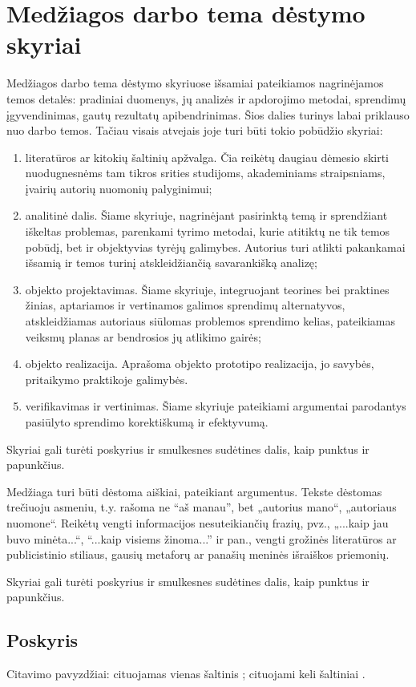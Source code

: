 \documentclass[
]{VUMIFSEMasterThesis}
\begin{document}
\section{Medžiagos darbo tema dėstymo skyriai}
Medžiagos darbo tema dėstymo skyriuose išsamiai pateikiamos nagrinėjamos temos detalės:
pradiniai duomenys, jų analizės ir apdorojimo metodai, sprendimų įgyvendinimas, gautų
rezultatų apibendrinimas. Šios dalies turinys labai priklauso nuo darbo temos. Tačiau
visais atvejais joje turi būti tokio pobūdžio skyriai:
\begin{enumerate}
\item literatūros ar kitokių šaltinių apžvalga. Čia reikėtų daugiau dėmesio skirti
nuodugnesnėms tam tikros srities studijoms, akademiniams straipsniams, įvairių autorių
nuomonių palyginimui;
\item analitinė dalis. Šiame skyriuje, nagrinėjant pasirinktą temą ir sprendžiant iškeltas
problemas, parenkami tyrimo metodai, kurie atitiktų ne tik temos pobūdį, bet ir
objektyvias tyrėjų galimybes. Autorius turi atlikti pakankamai išsamią ir temos turinį
atskleidžiančią savarankišką analizę;
\item objekto projektavimas. Šiame skyriuje, integruojant teorines bei praktines žinias,
aptariamos ir vertinamos galimos sprendimų alternatyvos, atskleidžiamas autoriaus 
siūlomas problemos sprendimo kelias, pateikiamas veiksmų planas ar bendrosios jų
atlikimo gairės;
\item objekto realizacija. Aprašoma objekto prototipo realizacija, jo savybės, pritaikymo
praktikoje galimybės.
\item verifikavimas ir vertinimas. Šiame skyriuje pateikiami argumentai parodantys
pasiūlyto sprendimo korektiškumą ir efektyvumą.
\end{enumerate}
Skyriai gali turėti poskyrius ir smulkesnes sudėtines dalis, kaip punktus ir papunkčius.

Medžiaga turi būti dėstoma aiškiai, pateikiant argumentus. Tekste dėstomas
trečiuoju asmeniu, t.y. rašoma ne \enquote{aš manau}, bet „autorius mano“, „autoriaus
nuomone“. Reikėtų vengti informacijos nesuteikiančių frazių, pvz., „...kaip jau
buvo minėta...“, \enquote{...kaip visiems žinoma...} ir pan., vengti grožinės
literatūros ar publicistinio stiliaus, gausių metaforų ar panašių meninės
išraiškos priemonių.

Skyriai gali turėti poskyrius ir smulkesnes sudėtines dalis, kaip punktus ir
papunkčius.

\subsection{Poskyris}
Citavimo pavyzdžiai: cituojamas vienas šaltinis \cite{PvzStraipsnLt}; cituojami
keli šaltiniai \cite{PvzStraipsnEn, ArticleByOrg, PvzKonfLt, PvzKonfEn, PvzKnygLt, PvzKnygEn,
PvzElPubLt, PvzElPubEn, PvzBakLt, PvzMagistrLt, PvzPhdEn}.
\end{document}
